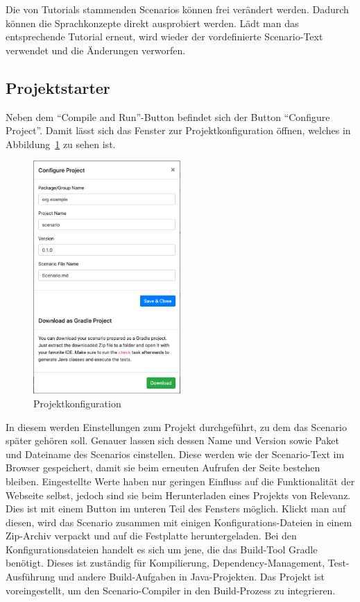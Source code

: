Die von Tutorials stammenden Scenarios können frei verändert werden.
Dadurch können die Sprachkonzepte direkt ausprobiert werden.
Lädt man das entsprechende Tutorial erneut, wird wieder der vordefinierte Scenario-Text verwendet und die Änderungen verworfen.

\subsection{Projektstarter}\label{subsec:project-starter}

Neben dem ``Compile and Run''-Button befindet sich der Button ``Configure Project''.
Damit lässt sich das Fenster zur Projektkonfiguration öffnen, welches in Abbildung~\ref{fig:project-config} zu sehen ist.

\begin{figure}
    \centering
    \includegraphics[width=0.5\textwidth]{chapter/fulib.org/img/project-config.png}
    \caption{Projektkonfiguration}
    \label{fig:project-config}
\end{figure}

In diesem werden Einstellungen zum Projekt durchgeführt, zu dem das Scenario später gehören soll.
Genauer lassen sich dessen Name und Version sowie Paket und Dateiname des Scenarios einstellen.
Diese werden wie der Scenario-Text im Browser gespeichert, damit sie beim erneuten Aufrufen der Seite bestehen bleiben.
Eingestellte Werte haben nur geringen Einfluss auf die Funktionalität der Webseite selbst,
jedoch sind sie beim Herunterladen eines Projekts von Relevanz.
Dies ist mit einem Button im unteren Teil des Fensters möglich.
Klickt man auf diesen, wird das Scenario zusammen mit einigen Konfigurations-Dateien in einem Zip-Archiv verpackt und auf die Festplatte heruntergeladen.
Bei den Konfigurationsdateien handelt es sich um jene, die das Build-Tool Gradle~\cite{gradle} benötigt.
Dieses ist zuständig für Kompilierung, Dependency-Management, Test-Ausführung und andere Build-Aufgaben in Java-Projekten.
Das Projekt ist voreingestellt, um den Scenario-Compiler in den Build-Prozess zu integrieren.

